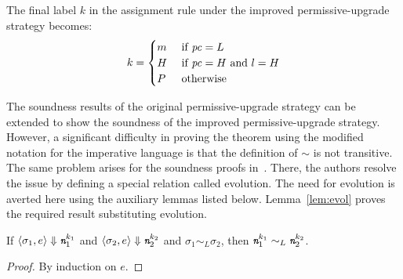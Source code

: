 The final label $k$ in the assignment rule  under
the improved permissive-upgrade strategy becomes: 
$$ k = %
\begin{cases}
m & \mbox{ if } \pc = L \\
H  & \mbox{ if } \pc = H \mbox{ and } l = H\\
P  & \mbox{ otherwise}
\end{cases} %
$$


The soundness results of the original permissive-upgrade strategy can
be extended to show the soundness of the improved permissive-upgrade
strategy. However, a significant difficulty in proving the theorem
using the modified notation for the imperative language is that the
definition of $\sim$ is not transitive. The same problem arises for
the soundness proofs in~\cite{plas10}. There, the authors resolve the
issue by defining a special relation called evolution. The need for
evolution is averted here using the auxiliary lemmas listed
below. Lemma~\ref{lem:evol} proves the required result substituting
evolution.  

\begin{myLemma}
\label{lem:expeval}
If $\langle \sigma_1, e \rangle \Downarrow \emph{\texttt{n}}_1^{k_1}$ and $\langle 
\sigma_2, e \rangle \Downarrow \emph{\texttt{n}}_2^{k_2}$ and $\sigma_1 \sim_L
\sigma_2$, then $\emph{\texttt{n}}_1^{k_1} \sim_L \emph{\texttt{n}}_2^{k_2}$.
\end{myLemma}
\begin{proof} By induction on $e$.
\end{proof}

